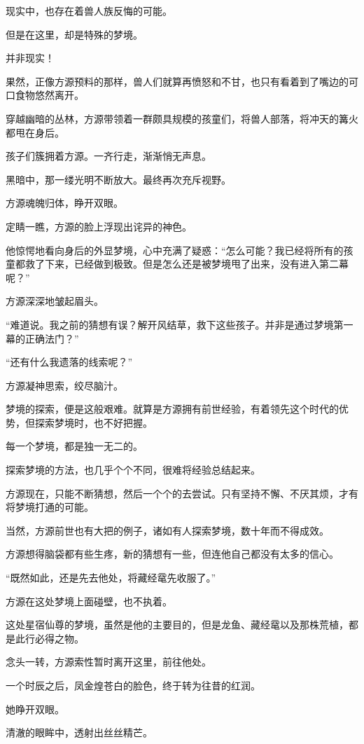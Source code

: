 \begin{this_body}
现实中，也存在着兽人族反悔的可能。

但是在这里，却是特殊的梦境。

并非现实！

果然，正像方源预料的那样，兽人们就算再愤怒和不甘，也只有看着到了嘴边的可口食物悠然离开。

穿越幽暗的丛林，方源带领着一群颇具规模的孩童们，将兽人部落，将冲天的篝火都甩在身后。

孩子们簇拥着方源。一齐行走，渐渐悄无声息。

黑暗中，那一缕光明不断放大。最终再次充斥视野。

方源魂魄归体，睁开双眼。

定睛一瞧，方源的脸上浮现出诧异的神色。

他惊愕地看向身后的外显梦境，心中充满了疑惑：“怎么可能？我已经将所有的孩童都救了下来，已经做到极致。但是怎么还是被梦境甩了出来，没有进入第二幕呢？”

方源深深地皱起眉头。

“难道说。我之前的猜想有误？解开风结草，救下这些孩子。并非是通过梦境第一幕的正确法门？”

“还有什么我遗落的线索呢？”

方源凝神思索，绞尽脑汁。

梦境的探索，便是这般艰难。就算是方源拥有前世经验，有着领先这个时代的优势，但探索梦境时，也不好把握。

每一个梦境，都是独一无二的。

探索梦境的方法，也几乎个个不同，很难将经验总结起来。

方源现在，只能不断猜想，然后一个个的去尝试。只有坚持不懈、不厌其烦，才有将梦境打通的可能。

当然，方源前世也有大把的例子，诸如有人探索梦境，数十年而不得成效。

方源想得脑袋都有些生疼，新的猜想有一些，但连他自己都没有太多的信心。

“既然如此，还是先去他处，将藏经鼋先收服了。”

方源在这处梦境上面碰壁，也不执着。

这处星宿仙尊的梦境，虽然是他的主要目的，但是龙鱼、藏经鼋以及那株荒植，都是此行必得之物。

念头一转，方源索性暂时离开这里，前往他处。

一个时辰之后，凤金煌苍白的脸色，终于转为往昔的红润。

她睁开双眼。

清澈的眼眸中，透射出丝丝精芒。


\end{this_body}
